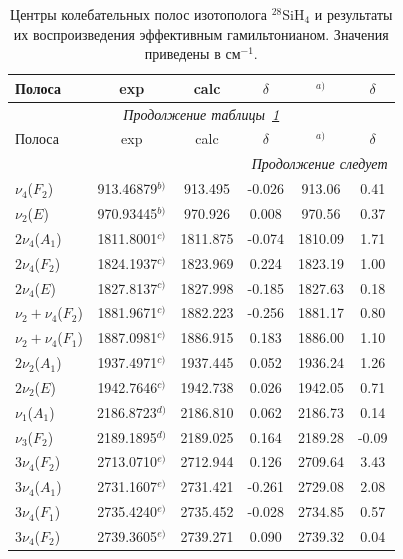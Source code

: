 \begingroup
\scriptsize
\setlength{\tabcolsep}{3pt}
\renewcommand{\arraystretch}{1.05}
\begin{longtable}{lccccc}
\caption{Центры колебательных полос изотополога ${}^{28}$SiH$_4$ и результаты их воспроизведения эффективным гамильтонианом. Значения приведены в см$^{-1}$.}\label{tab:si_band_centers_fit}\\
\hline
Полоса & exp & calc & $\delta$ & \cite{wang}$^{a)}$ & $\delta$ \\
\hline
\endfirsthead
\hline
\multicolumn{6}{c}{\small\slshape Продолжение таблицы~\ref{tab:si_band_centers_fit}}\\
\hline
Полоса & exp & calc & $\delta$ & \cite{wang}$^{a)}$ & $\delta$ \\
\hline
\endhead
\hline
\multicolumn{6}{r}{\small\slshape Продолжение следует}\\
\endfoot
\hline\hline
\endlastfoot
$\nu_4$($F_2$) & 913.46879$^{b)}$ & 913.495 & -0.026 & 913.06 & 0.41 \\
$\nu_2$($E$) & 970.93445$^{b)}$ & 970.926 & 0.008 & 970.56 & 0.37 \\
$2\nu_4$($A_1$) & 1811.8001$^{c)}$ & 1811.875 & -0.074 & 1810.09 & 1.71 \\
$2\nu_4$($F_2$) & 1824.1937$^{c)}$ & 1823.969 & 0.224 & 1823.19 & 1.00 \\
$2\nu_4$($E  $) & 1827.8137$^{c)}$ & 1827.998 & -0.185 & 1827.63 & 0.18 \\
$\nu_2+\nu_4$($F_2$) & 1881.9671$^{c)}$ & 1882.223 & -0.256 & 1881.17 & 0.80 \\
$\nu_2+\nu_4$($F_1$) & 1887.0981$^{c)}$ & 1886.915 & 0.183 & 1886.00 & 1.10 \\
$2\nu_2$($A_1$) & 1937.4971$^{c)}$ & 1937.445 & 0.052 & 1936.24 & 1.26 \\
$2\nu_2$($E  $) & 1942.7646$^{c)}$ & 1942.738 & 0.026 & 1942.05 & 0.71 \\
$\nu_1$($A_1$) & 2186.8723$^{d)}$ & 2186.810 & 0.062 & 2186.73 & 0.14 \\
$\nu_3$($F_2$) & 2189.1895$^{d)}$ & 2189.025 & 0.164 & 2189.28 & -0.09 \\
$3\nu_4$($F_2$) & 2713.0710$^{e)}$ & 2712.944 & 0.126 & 2709.64 & 3.43 \\
$3\nu_4$($A_1$) & 2731.1607$^{e)}$ & 2731.421 & -0.261 & 2729.08 & 2.08 \\
$3\nu_4$($F_1$) & 2735.4240$^{e)}$ & 2735.452 & -0.028 & 2734.85 & 0.57 \\
$3\nu_4$($F_2$) & 2739.3605$^{e)}$ & 2739.271 & 0.090 & 2739.32 & 0.04 \\

\end{longtable}
